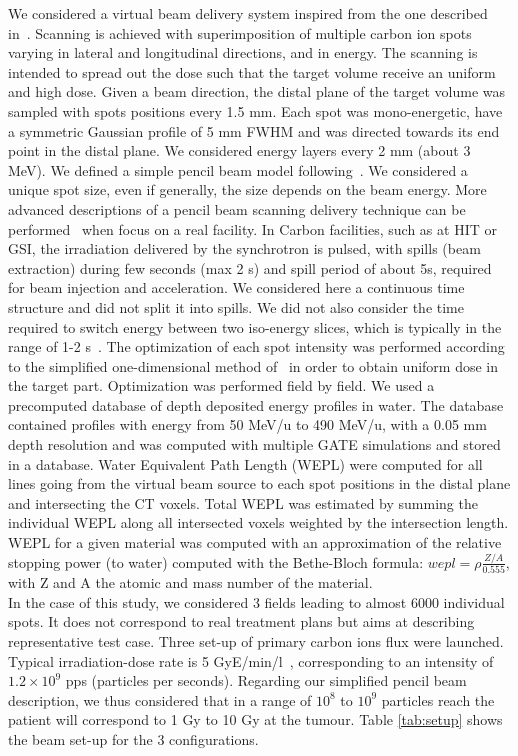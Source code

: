 \documentclass[11pt]{iopart}
\begin{document}
We considered a virtual beam delivery system inspired from the one described in~\cite{Kramer2000a}. Scanning is achieved with superimposition of multiple carbon ion spots varying in lateral and longitudinal directions, and in energy. The scanning is intended to spread out the dose such that the target volume receive an uniform and high dose.  Given a beam direction, the distal plane of the target volume was sampled with spots positions every 1.5 mm. Each spot was mono-energetic, have a symmetric Gaussian profile of 5 mm FWHM and was directed towards its end point in the distal plane. We considered energy layers every 2 mm (about 3 MeV). We defined a simple pencil
beam model following~\cite{Grevillot2010}. We considered a unique spot size, even if generally, the size depends on the beam energy. More advanced descriptions of a pencil beam scanning delivery technique can be performed~\cite{Grevillot2010} when focus on a real facility. In Carbon facilities, such as at HIT or GSI, the irradiation delivered by the synchrotron is pulsed, with spills (beam extraction) during few seconds (max 2 s) and spill period of about 5s, required for beam injection and acceleration. We considered here a continuous time structure and did not split it into spills. We did not also consider the time required to switch energy between two iso-energy slices, which is typically in the range of 1-2 s~\cite{Rietzel2010}. The optimization of each spot intensity was performed according to the simplified one-dimensional method of~\cite{Kramer2000a} in order to obtain uniform dose in the target part. Optimization was performed field by field. We used a precomputed database of depth deposited energy profiles in water. The database contained profiles with energy from 50 MeV/u to 490 MeV/u, with a 0.05 mm depth resolution and was computed with multiple GATE simulations and stored in a database. Water Equivalent Path Length (WEPL) were computed for all lines going from the virtual beam source to each spot positions in the distal plane and intersecting the CT voxels. Total WEPL was estimated by summing the individual WEPL along all intersected voxels weighted by the intersection length. WEPL for a given material was computed with an approximation of the relative stopping power (to water) computed with the Bethe-Bloch formula: $wepl = \rho \frac{Z/A}{0.555}$, with Z and A the atomic and mass number of the material.\\
In the case of this study, we considered 3 fields leading to almost 6000 individual spots. It does not correspond to real treatment plans but aims at describing representative test case. Three set-up of primary carbon ions flux were launched. Typical irradiation-dose rate is 5 GyE/min/l~\cite{Noda2007}, corresponding to an intensity of $1.2\times 10^9$ pps (particles per seconds). Regarding our simplified pencil beam description, we thus considered that in a range of $10^8$ to $10^9$ particles reach the patient will correspond to 1 Gy to 10 Gy at the tumour. Table \ref{tab:setup} shows the beam set-up for the 3 configurations.
\end{document}
